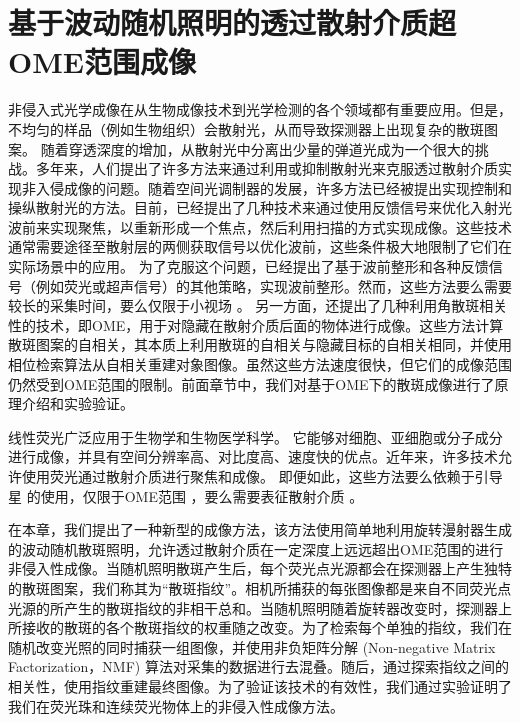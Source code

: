 
\chapter{基于波动随机照明的透过散射介质超OME范围成像}\label{chap:5}

非侵入式光学成像在从生物成像技术\cite{zhao_non-invasive_2001,artzi_vivo_2011}到光学检测\cite{kozloff_non-invasive_2009}的各个领域都有重要应用。但是，不均匀的样品（例如生物组织）会散射光，从而导致探测器上出现复杂的散斑图案\cite{Goodman1976,Bender}。
随着穿透深度的增加，从散射光中分离出少量的弹道光成为一个很大的挑战\cite{Abramson1978,huang_optical_1991}。多年来，人们提出了许多方法来通过利用或抑制散射光来克服透过散射介质实现非入侵成像的问题。随着空间光调制器的发展，许多方法已经被提出实现控制和操纵散射光的方法\cite{Mosk2012,rotter_light_2017}。目前，已经提出了几种技术来通过使用反馈信号来优化入射光波前来实现聚焦，以重新形成一个焦点，然后利用扫描的方式实现成像\cite{Vellekoop2007,Horstmeyer2015}。这些技术通常需要途径至散射层的两侧获取信号以优化波前，这些条件极大地限制了它们在实际场景中的应用。
为了克服这个问题，已经提出了基于波前整形和各种反馈信号（例如荧光或超声信号）的其他策略\cite{Horstmeyer2015,Katz2019,Popoff2010,Hofer2019}，实现波前整形。然而，这些方法要么需要较长的采集时间，要么仅限于小视场 。
另一方面，还提出了几种利用角散斑相关性的技术\cite{bertolotti_non-invasive_2012,katz_non-invasive_2014}，即OME\cite{Freund1988,Yllmaz2019,Osnabrugge}，用于对隐藏在散射介质后面的物体进行成像。这些方法计算散斑图案的自相关，其本质上利用散斑的自相关与隐藏目标的自相关相同，并使用相位检索算法从自相关重建对象图像。虽然这些方法速度很快，但它们的成像范围仍然受到OME范围的限制。前面章节中，我们对基于OME下的散斑成像进行了原理介绍和实验验证。

线性荧光广泛应用于生物学和生物医学科学\cite{Ruan2020,Lichtman2005,mangeat_super_resolved_2021}。 它能够对细胞、亚细胞或分子成分进行成像，并具有空间分辨率高、对比度高、速度快的优点。近年来，许多技术允许使用荧光通过散射介质进行聚焦和成像。
即便如此，这些方法要么依赖于引导星 \cite{Hhorstmeyer} 的使用，仅限于OME范围 \cite{hofer_wide_2018}，要么需要表征散射介质 \cite{boniface_non_invasive_2020}。

在本章，我们提出了一种新型的成像方法，该方法使用简单地利用旋转漫射器生成的波动随机散斑照明，允许透过散射介质在一定深度上远远超出OME范围的进行非侵入性成像。当随机照明散斑产生后，每个荧光点光源都会在探测器上产生独特的散斑图案，我们称其为“散斑指纹”。相机所捕获的每张图像都是来自不同荧光点光源的所产生的散斑指纹的非相干总和。当随机照明随着旋转器改变时，探测器上所接收的散斑的各个散斑指纹的权重随之改变。为了检索每个单独的指纹，我们在随机改变光照的同时捕获一组图像，并使用非负矩阵分解 (Non-negative Matrix Factorization，NMF) 算法对采集的数据进行去混叠。随后，通过探索指纹之间的相关性，使用指纹重建最终图像。为了验证该技术的有效性，我们通过实验证明了我们在荧光珠和连续荧光物体上的非侵入性成像方法。

